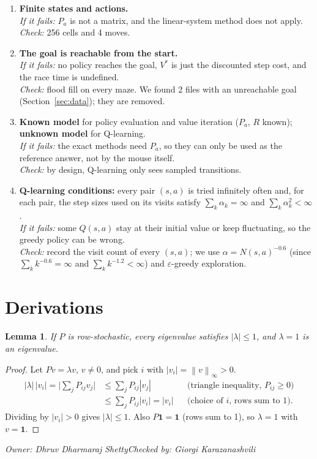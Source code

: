 \documentclass[10pt]{article}
\newtheorem{lemma}{Lemma}
\theoremstyle{definition}
\newcommand{\GK}{Giorgi Karazanashvili}
\newcommand{\DS}{Dhruv Dharmaraj Shetty}
\newcommand{\signoff}[2]{\par\smallskip\hfill\emph{Owner: #1}\qquad\emph{Checked by: #2}\par\medskip}
\newcommand{\one}{\mathbf{1}}
\newcommand{\norm}[1]{\left\lVert #1\right\rVert_\infty}
\begin{document}
\begin{enumerate}[label=\textbf{A\arabic*.}, leftmargin=2.2em, itemsep=6pt]
\item \textbf{Finite states and actions.}\\
\emph{If it fails:} $P_a$ is not a matrix, and the linear-system method does not apply.\\
\emph{Check:} 256 cells and 4 moves.

\item \textbf{The goal is reachable from the start.}\\
\emph{If it fails:} no policy reaches the goal, $V^*$ is just the discounted step cost, and the race time is undefined.\\
\emph{Check:} flood fill on every maze. We found 2 files with an unreachable goal (Section~\ref{sec:data}); they are removed.

\item \textbf{Known model} for policy evaluation and value iteration ($P_a$, $R$ known); \textbf{unknown model} for Q-learning.\\
\emph{If it fails:} the exact methods need $P_a$, so they can only be used as the reference answer, not by the mouse itself.\\
\emph{Check:} by design, Q-learning only sees sampled transitions.

\item \textbf{Q-learning conditions:} every pair $(s,a)$ is tried infinitely often and, for each pair, the step sizes used on its visits satisfy $\sum_k\alpha_k = \infty$ and $\sum_k\alpha_k^2<\infty$.\\
\emph{If it fails:} some $Q(s,a)$ stay at their initial value or keep fluctuating, so the greedy policy can be wrong.\\
\emph{Check:} record the visit count of every $(s,a)$; we use $\alpha = N(s,a)^{-0.6}$ (since $\sum_k k^{-0.6} = \infty$ and $\sum_k k^{-1.2}<\infty$) and $\varepsilon$-greedy exploration.
\end{enumerate}

\section{Derivations}\label{sec:deriv}

\begin{lemma}\label{lem:eig}
If $P$ is row-stochastic, every eigenvalue satisfies $|\lambda|\le 1$, and $\lambda = 1$ is an eigenvalue.
\end{lemma}
\begin{proof}
Let $Pv = \lambda v$, $v\ne 0$, and pick $i$ with $|v_i| = \norm{v}>0$.
\begin{align*}
|\lambda|\,|v_i| = \Big|\sum_j P_{ij}v_j\Big| &\le \sum_j P_{ij}|v_j| && \text{(triangle inequality, $P_{ij}\ge0$)}\\
&\le \sum_j P_{ij}|v_i| = |v_i| && \text{(choice of $i$, rows sum to 1).}
\end{align*}
Dividing by $|v_i|>0$ gives $|\lambda|\le 1$. Also $P\one = \one$ (rows sum to 1), so $\lambda = 1$ with $v = \one$.
\end{proof}
\signoff{\DS}{\GK}
\end{document}
